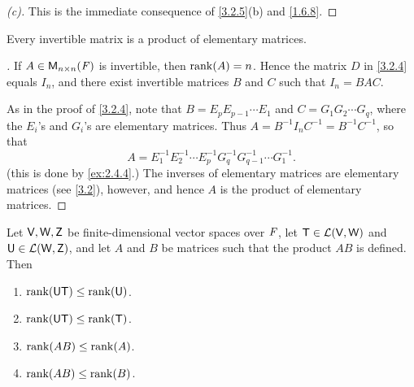 \begin{proof}[(c)]
	This is the immediate consequence of \cref{3.2.5}(b) and \cref{1.6.8}.
\end{proof}

\begin{cor}\label{3.2.6}
	Every invertible matrix is a product of elementary matrices.
\end{cor}

\begin{proof}[]
	If \(A \in \mathsf{M}_{{n} \times n}({\mathit{F}})\) is invertible, then \(\rk{A} = n\).
	Hence the matrix \(D\) in \cref{3.2.4} equals \(I_n\), and there exist invertible matrices \(B\) and \(C\) such that \(I_n = BAC\).

	As in the proof of \cref{3.2.4}, note that \(B = E_p E_{p - 1} \cdots E_1\) and \(C = G_1 G_2 \cdots G_q\), where the \(E_i\)'s and \(G_i\)'s are elementary matrices.
	Thus \(A = B^{-1} I_n C^{-1} = B^{-1} C^{-1}\), so that
	\[
		A = E_1^{-1} E_2^{-1} \cdots E_p^{-1} G_q^{-1} G_{q - 1}^{-1} \cdots G_1^{-1}.
	\]
	(this is done by \cref{ex:2.4.4}.)
	The inverses of elementary matrices are elementary matrices (see \cref{3.2}), however, and hence \(A\) is the product of elementary matrices.
\end{proof}

\begin{thm}\label{3.7}
	Let \(\mathsf{V}, \mathsf{W}, \mathsf{Z}\) be finite-dimensional vector spaces over \(\mathit{F}\), let \(\mathsf{T} \in \mathcal{L}(\mathsf{V}, \mathsf{W})\) and \(\mathsf{U} \in \mathcal{L}(\mathsf{W}, \mathsf{Z})\), and let \(A\) and \(B\) be matrices such that the product \(AB\) is defined.
	Then
	\begin{enumerate}
		\item \(\rk{\U \T} \leq \rk{\U}\).
		\item \(\rk{\U \T} \leq \rk{\T}\).
		\item \(\rk{AB} \leq \rk{A}\).
		\item \(\rk{AB} \leq \rk{B}\).
	\end{enumerate}
\end{thm}

